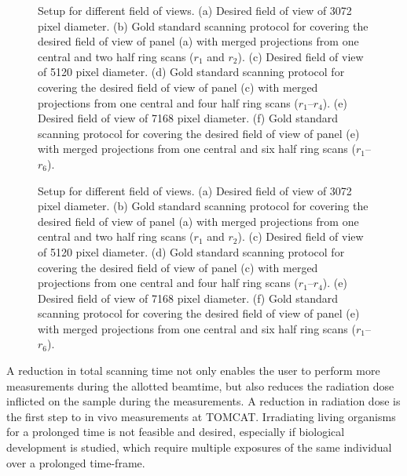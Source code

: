 \ifiucr
	\begin{figure}%
		\centering%
		\caption{Setup for different field of views. %
		(a) Desired field of view of 3072 pixel diameter. %
		(b) Gold standard scanning protocol for covering the desired field of view of panel (a) with merged projections from one central and two half ring scans ($r_{1}$ and $r_{2}$). %
		(c) Desired field of view of 5120 pixel diameter. %
		(d) Gold standard scanning protocol for covering the desired field of view of panel (c) with merged projections from one central and four half ring scans ($r_{1}$--$r_{4}$). %
		(e) Desired field of view of 7168 pixel diameter. %
		(f) Gold standard scanning protocol for covering the desired field of view of panel (e) with merged projections from one central and six half ring scans ($r_{1}$--$r_{6}$).%
		}%
		
		\label{fig:SubScan-Setup}%
	\end{figure}%
\else
	\begin{figure*}[htp]
		\centering%
		
		\caption{Setup for different field of views. %
		(a) Desired field of view of 3072 pixel diameter. %
		(b) Gold standard scanning protocol for covering the desired field of view of panel (a) with merged projections from one central and two half ring scans ($r_{1}$ and $r_{2}$). %
		(c) Desired field of view of 5120 pixel diameter. %
		(d) Gold standard scanning protocol for covering the desired field of view of panel (c) with merged projections from one central and four half ring scans ($r_{1}$--$r_{4}$). %
		(e) Desired field of view of 7168 pixel diameter. %
		(f) Gold standard scanning protocol for covering the desired field of view of panel (e) with merged projections from one central and six half ring scans ($r_{1}$--$r_{6}$).%
		}%
		\label{fig:SubScan-Setup}%
	\end{figure*}
\fi

A reduction in total scanning time not only enables the user to perform more measurements during the allotted beamtime, but also reduces the radiation dose inflicted on the sample during the measurements. A reduction in radiation dose is the first step to in vivo measurements at TOMCAT. Irradiating living organisms for a prolonged time is not feasible and desired, especially if biological development is studied, which require multiple exposures of the same individual over a prolonged time-frame.

